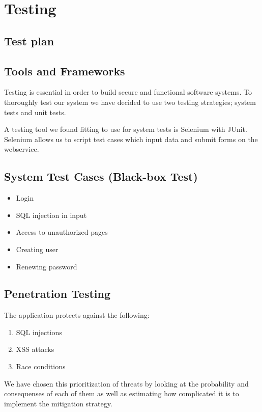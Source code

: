 \documentclass[a4paper]{article}
\begin{document}
\section{Testing}

\subsection{Test plan}

\subsection{Tools and Frameworks}
Testing is essential in order to build secure and functional software systems. To thoroughly test our system we have decided to use two testing strategies; system tests and unit tests.

A testing tool we found fitting to use for system tests is Selenium with JUnit. Selenium allows us to script test cases which input data and submit forms on the webservice.

\subsection{System Test Cases (Black-box Test)}

\begin{itemize}
\item Login
\item SQL injection in input
\item Access to unauthorized pages
\item Creating user
\item Renewing password
\end{itemize}

\subsection{Penetration Testing}
The application protects against the following:
\begin{enumerate}
\item{SQL injections}
\item{XSS attacks}
\item{Race conditions}
\end{enumerate}

We have chosen this prioritization of threats by looking at the probability and consequenses of each of them as well as estimating how complicated it is to implement the mitigation strategy.
\end{document}
